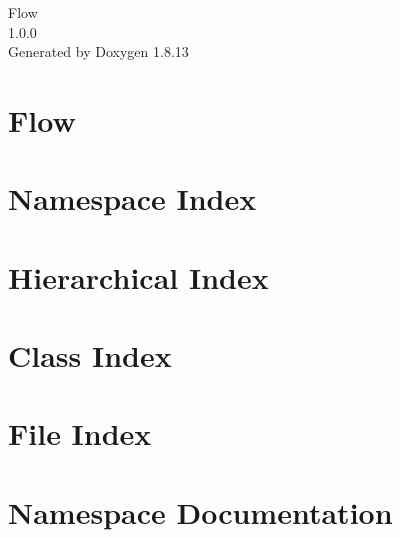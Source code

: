 \documentclass[twoside]{book}
\newcommand{\+}{\discretionary{\mbox{\scriptsize$\hookleftarrow$}}{}{}}
\newcommand{\clearemptydoublepage}{%
  \newpage{\pagestyle{empty}\cleardoublepage}%
}
\begin{document}
\hypersetup{pageanchor=false,
             bookmarksnumbered=true,
             pdfencoding=unicode
            }
\begin{titlepage}
\vspace*{7cm}
\begin{center}%
{\Large Flow \\[1ex]\large 1.\+0.\+0 }\\
\vspace*{1cm}
{\large Generated by Doxygen 1.8.13}\\
\end{center}
\end{titlepage}
\clearemptydoublepage
{}
\tableofcontents
\clearemptydoublepage
{}
\hypersetup{pageanchor=true}

\chapter{Flow}
\label{index}\hypertarget{index}{}
\chapter{Namespace Index}

\chapter{Hierarchical Index}

\chapter{Class Index}

\chapter{File Index}

\chapter{Namespace Documentation}



\end{document}
